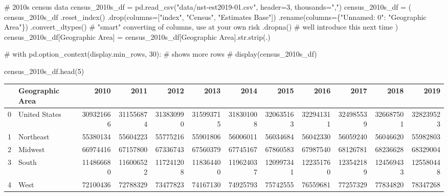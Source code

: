 \documentclass[
  letterpaper,
  DIV=11,
  numbers=noendperiod]{scrreprt}
\newenvironment{Shaded}{\begin{snugshade}}{\end{snugshade}}
\newcommand{\BuiltInTok}[1]{\textcolor[rgb]{0.00,0.23,0.31}{#1}}
\newcommand{\CommentTok}[1]{\textcolor[rgb]{0.37,0.37,0.37}{#1}}
\newcommand{\DecValTok}[1]{\textcolor[rgb]{0.68,0.00,0.00}{#1}}
\newcommand{\NormalTok}[1]{\textcolor[rgb]{0.00,0.23,0.31}{#1}}
\newcommand{\OperatorTok}[1]{\textcolor[rgb]{0.37,0.37,0.37}{#1}}
\newcommand{\StringTok}[1]{\textcolor[rgb]{0.13,0.47,0.30}{#1}}
\begin{document}
\begin{Shaded}
\begin{Highlighting}[]
\CommentTok{\# 2010s census data}
\NormalTok{census\_2010s\_df }\OperatorTok{=}\NormalTok{ pd.read\_csv(}\StringTok{"data/nst{-}est2019{-}01.csv"}\NormalTok{, header}\OperatorTok{=}\DecValTok{3}\NormalTok{, thousands}\OperatorTok{=}\StringTok{","}\NormalTok{)}
\NormalTok{census\_2010s\_df }\OperatorTok{=}\NormalTok{ (}
\NormalTok{    census\_2010s\_df}
\NormalTok{    .reset\_index()}
\NormalTok{    .drop(columns}\OperatorTok{=}\NormalTok{[}\StringTok{"index"}\NormalTok{, }\StringTok{"Census"}\NormalTok{, }\StringTok{"Estimates Base"}\NormalTok{])}
\NormalTok{    .rename(columns}\OperatorTok{=}\NormalTok{\{}\StringTok{"Unnamed: 0"}\NormalTok{: }\StringTok{"Geographic Area"}\NormalTok{\})}
\NormalTok{    .convert\_dtypes()                 }\CommentTok{\# "smart" converting of columns, use at your own risk}
\NormalTok{    .dropna()                         }\CommentTok{\# we\textquotesingle{}ll introduce this next time}
\NormalTok{)}
\NormalTok{census\_2010s\_df[}\StringTok{\textquotesingle{}Geographic Area\textquotesingle{}}\NormalTok{] }\OperatorTok{=}\NormalTok{ census\_2010s\_df[}\StringTok{\textquotesingle{}Geographic Area\textquotesingle{}}\NormalTok{].}\BuiltInTok{str}\NormalTok{.strip(}\StringTok{\textquotesingle{}.\textquotesingle{}}\NormalTok{)}

\CommentTok{\# with pd.option\_context(\textquotesingle{}display.min\_rows\textquotesingle{}, 30): \# shows more rows}
\CommentTok{\#     display(census\_2010s\_df)}
    
\NormalTok{census\_2010s\_df.head(}\DecValTok{5}\NormalTok{)}
\end{Highlighting}
\end{Shaded}

\begin{tabular}{llrrrrrrrrrr}
\toprule
{} & Geographic Area &       2010 &       2011 &       2012 &       2013 &       2014 &       2015 &       2016 &       2017 &       2018 &       2019 \\
\midrule
0 &   United States &  309321666 &  311556874 &  313830990 &  315993715 &  318301008 &  320635163 &  322941311 &  324985539 &  326687501 &  328239523 \\
1 &       Northeast &   55380134 &   55604223 &   55775216 &   55901806 &   56006011 &   56034684 &   56042330 &   56059240 &   56046620 &   55982803 \\
2 &         Midwest &   66974416 &   67157800 &   67336743 &   67560379 &   67745167 &   67860583 &   67987540 &   68126781 &   68236628 &   68329004 \\
3 &           South &  114866680 &  116006522 &  117241208 &  118364400 &  119624037 &  120997341 &  122351760 &  123542189 &  124569433 &  125580448 \\
4 &            West &   72100436 &   72788329 &   73477823 &   74167130 &   74925793 &   75742555 &   76559681 &   77257329 &   77834820 &   78347268 \\
\bottomrule
\end{tabular}
\end{document}
